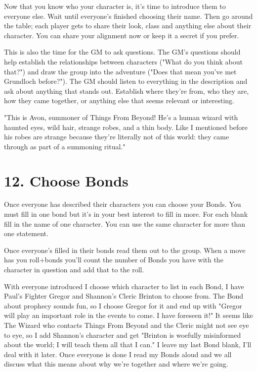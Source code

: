 Now that you know who your character is, it's time to introduce them to everyone else. Wait until everyone's finished choosing their name. Then go around the table; each player gets to share their look, class and anything else about their character. You can share your alignment now or keep it a secret if you prefer.

 

This is also the time for the GM to ask questions. The GM's questions should help establish the relationships between characters ("What do you think about that?") and draw the group into the adventure ("Does that mean you've met Grundloch before?"). The GM should listen to everything in the description and ask about anything that stands out. Establish where they're from, who they are, how they came together, or anything else that seems relevant or interesting.

 
\startExample
"This is Avon, summoner of Things From Beyond! He's a human wizard with haunted eyes, wild hair, strange robes, and a thin body. Like I mentioned before his robes are strange because they're literally not of this world: they came through as part of a summoning ritual."
\stopExample
 
\section{12. Choose Bonds}     
 

Once everyone has described their characters you can choose your Bonds. You must fill in one bond but it's in your best interest to fill in more. For each blank fill in the name of one character. You can use the same character for more than one statement.

 

Once everyone’s filled in their bonds read them out to the group. When a move has you roll+bonds you'll count the number of Bonds you have with the character in question and add that to the roll.

 
\startExample
With everyone introduced I choose which character to list in each Bond, I have Paul's Fighter Gregor and Shannon's Cleric Brinton to choose from. The Bond about prophecy sounds fun, so I choose Gregor for it and end up with "Gregor will play an important role in the events to come. I have foreseen it!" It seems like The Wizard who contacts Things From Beyond and the Cleric might not see eye to eye, so I add Shannon's character and get "Brinton is woefully misinformed about the world; I will teach them all that I can." I leave my last Bond blank, I'll deal with it later. Once everyone is done I read my Bonds aloud and we all discuss what this means about why we're together and where we're going.
\stopExample






 
